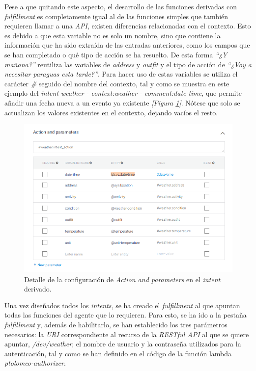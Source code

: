 \documentclass[11pt,spanish,listoffigures]{tfgetsinf}
\begin{document}
Pese a que quitando este aspecto, el desarrollo de las funciones derivadas con \textit{fulfillment} es completamente igual al de las funciones simples que también requieren llamar a una \textit{API}, existen diferencias relacionadas con el contexto. Esto es debido a que esta variable no es solo un nombre, sino que contiene la información que ha sido extraída de las entradas anteriores, como los campos que se han completado o qué tipo de acción se ha resuelto. De esta forma \textit{“¿Y mañana?”} reutiliza las variables de \textit{address} y \textit{outfit} y el tipo de acción de \textit{“¿Voy a necesitar paraguas esta tarde?”}. Para hacer uso de estas variables se utiliza el carácter \textit{\#} seguido del nombre del contexto, tal y como se muestra en este ejemplo del \textit{intent weather - context:weather - comment:date-time}, que permite añadir una fecha nueva a un evento ya existente \textit{[Figura \ref{fig:action-and-parameters2}]}. Nótese que solo se actualizan los valores existentes en el contexto, dejando vacíos el resto.

\begin{figure}[h!]
    \centering
    \includegraphics[width=1\textwidth]{images/img12.png}
    \caption{Detalle de la configuración de \textit{Action and parameters} en el \textit{intent} derivado.}
    \label{fig:action-and-parameters2}
\end{figure}

Una vez diseñados todos los \textit{intents}, se ha creado el \textit{fulfillment} al que apuntan todas las funciones del agente que lo requieren. Para esto, se ha ido a la pestaña \textit{fulfillment} y, además de habilitarlo, se han establecido los tres parámetros necesarios: la \textit{URI} correspondiente al recurso de la \textit{RESTful API} al que se quiere apuntar, \textit{/dev/weather}; el nombre de usuario y la contraseña utilizados para la autenticación, tal y como se han definido en el código de la función lambda \textit{ptolomeo-authorizer}. 
\end{document}
